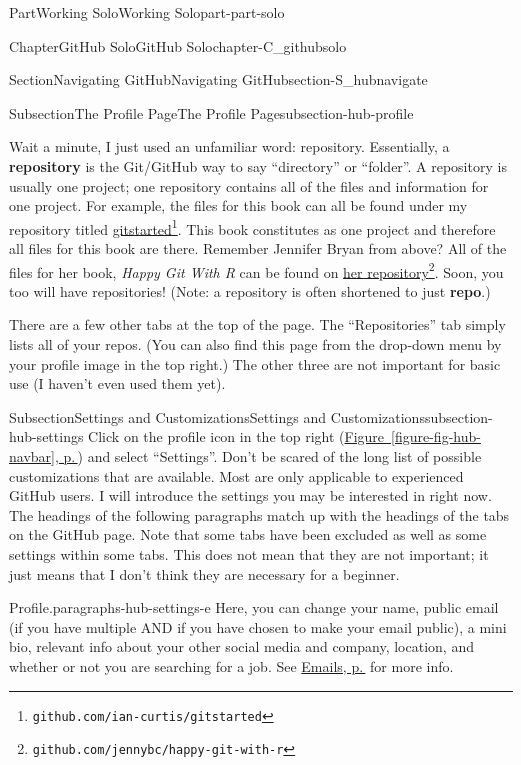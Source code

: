 \documentclass[twoside,10pt,]{book}
\newcommand{\xreffont}{\relax}
\newcommand{\terminology}[1]{\textbf{#1}}
\newcommand{\pubtitle}[1]{\textsl{#1}}
\begin{document}
\begin{partptx}{Part}{Working Solo}{}{Working Solo}{}{}{part-part-solo}
\begin{chapterptx}{Chapter}{GitHub Solo}{}{GitHub Solo}{}{}{chapter-C_githubsolo}
\begin{sectionptx}{Section}{Navigating GitHub}{}{Navigating GitHub}{}{}{section-S_hubnavigate}
\begin{subsectionptx}{Subsection}{The Profile Page}{}{The Profile Page}{}{}{subsection-hub-profile}
\par
Wait a minute, I just used an unfamiliar word: repository. Essentially, a \terminology{repository} is the Git\slash{}GitHub way to say ``directory'' or ``folder''. A repository is usually one project; one repository contains all of the files and information for one project. For example, the files for this book can all be found under my repository titled \href{https://github.com/ian-curtis/gitstarted}{gitstarted}\footnote{\nolinkurl{github.com/ian-curtis/gitstarted}\label{fn-hub-profile-l-e}}. This book constitutes as one project and therefore all files for this book are there. Remember Jennifer Bryan from above? All of the files for her book, \pubtitle{Happy Git With R} can be found on \href{https://github.com/jennybc/happy-git-with-r}{her repository}\footnote{\nolinkurl{github.com/jennybc/happy-git-with-r}\label{fn-hub-profile-l-h}}. Soon, you too will have repositories! (Note: a repository is often shortened to just \terminology{repo}.)%
\par
There are a few other tabs at the top of the page. The ``Repositories'' tab simply lists all of your repos. (You can also find this page from the drop-down menu by your profile image in the top right.) The other three are not important for basic use (I haven't even used them yet).%
\end{subsectionptx}
%
%
\typeout{************************************************}
\typeout{************************************************}
%
\begin{subsectionptx}{Subsection}{Settings and Customizations}{}{Settings and Customizations}{}{}{subsection-hub-settings}
%
%
Click on the profile icon in the top right (\hyperref[figure-fig-hub-navbar]{Figure~{\xreffont\ref{figure-fig-hub-navbar}}, p.\,\pageref{figure-fig-hub-navbar}}) and select ``Settings''. Don't be scared of the long list of possible customizations that are available. Most are only applicable to experienced GitHub users. I will introduce the settings you may be interested in right now. The headings of the following paragraphs match up with the headings of the tabs on the GitHub page. Note that some tabs have been excluded as well as some settings within some tabs. This does not mean that they are not important; it just means that I don't think they are necessary for a beginner.%
\begin{paragraphs}{Profile.}{paragraphs-hub-settings-e}%
%
Here, you can change your name, public email (if you have multiple AND if you have chosen to make your email public), a mini bio, relevant info about your other social media and company, location, and whether or not you are searching for a job. See \hyperlink{paragraphs-hub-emails}{Emails, p.\,\pageref{paragraphs-hub-emails}} for more info.%

\end{paragraphs}
\end{subsectionptx}
\end{sectionptx}
\end{chapterptx}
\end{partptx}
\end{document}
